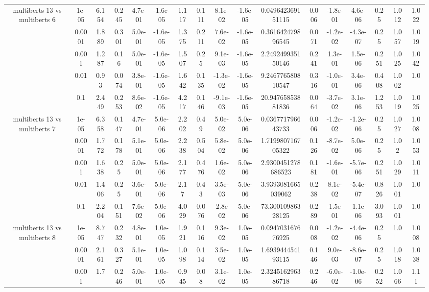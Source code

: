 \begin{tabular}{|c|c|c|c|c|c|c|c|c|c|c|c|c|c|c|c|c|}
\hline
\multirow{5}{*}{multiberts 13 vs multiberts 6} & 1e-05 & 6.154 & 0.245 & 4.7e-01 & -1.6e-05 & 1.117 & 0.111 & 8.1e-02 & -1.6e-05 & 0.049642369151115 & 0.006 & -1.8e-01 & 4.6e-06 & 0.25 & 1.012 & 1.022 \\
 & 0.0001 & 1.889 & 0.301 & 5.0e-01 & -1.6e-05 & 1.375 & 0.211 & 7.6e-02 & -1.6e-05 & 0.361642479896545 & 0.071 & -1.2e-02 & -4.3e-07 & 0.25 & 1.057 & 1.019 \\
 & 0.001 & 1.287 & 0.16 & 5.0e-01 & -1.6e-05 & 1.507 & 0.25 & 9.1e-03 & -1.6e-05 & 2.249249935150146 & 0.241 & 1.3e-01 & 1.5e-06 & 0.251 & 1.025 & 1.042 \\
 & 0.01 & 0.93 & 0.074 & 3.8e-01 & -1.6e-05 & 1.642 & 0.135 & -1.3e-02 & -1.6e-05 & 9.246776580810547 & 0.316 & -1.0e-01 & 3.4e-06 & 0.408 & 1.002 & 1.0 \\
 & 0.1 & 2.449 & 0.253 & 8.6e-02 & -1.6e-05 & 4.217 & 0.146 & -9.1e-03 & -1.6e-05 & 20.94765853881836 & 0.064 & -3.7e-02 & 3.1e-06 & 1.253 & 1.019 & 1.025 \\
\hline
\multirow{5}{*}{multiberts 13 vs multiberts 7} & 1e-05 & 6.358 & 0.147 & 4.7e-01 & 5.0e-06 & 2.202 & 0.49 & 5.0e-02 & 5.0e-06 & 0.036771796643733 & 0.006 & -1.2e-02 & -1.2e-06 & 0.25 & 1.027 & 1.008 \\
 & 0.0001 & 1.772 & 0.178 & 5.1e-01 & 5.0e-06 & 2.238 & 0.504 & 5.8e-02 & 5.0e-06 & 1.719980716705322 & 0.126 & -8.7e-02 & 5.0e-06 & 0.25 & 1.02 & 1.053 \\
 & 0.001 & 1.638 & 0.25 & 5.0e-01 & 5.0e-06 & 2.177 & 0.476 & 1.6e-02 & 5.0e-06 & 2.9300451278686523 & 0.181 & -1.6e-01 & -5.7e-06 & 0.251 & 1.029 & 1.011 \\
 & 0.01 & 1.406 & 0.25 & 3.6e-01 & 5.0e-06 & 2.17 & 0.43 & 3.5e-03 & 5.0e-06 & 3.9393081665039062 & 0.238 & 8.1e-02 & -5.4e-07 & 0.826 & 1.001 & 1.0 \\
 & 0.1 & 2.204 & 0.151 & 7.6e-02 & 5.0e-06 & 4.029 & 0.076 & -2.8e-02 & 5.0e-06 & 73.30010986328125 & 0.289 & -1.5e-01 & -1.1e-06 & 3.093 & 1.001 & 1.0 \\
\hline
\multirow{5}{*}{multiberts 13 vs multiberts 8} & 1e-05 & 8.747 & 0.232 & 4.8e-01 & 1.0e-05 & 1.921 & 0.116 & 9.3e-02 & 1.0e-05 & 0.094703167676925 & 0.008 & -1.2e-02 & -4.4e-06 & 0.25 & 1.0 & 1.008 \\
 & 0.0001 & 2.161 & 0.327 & 5.1e-01 & 1.0e-05 & 1.098 & 0.114 & 3.5e-02 & 1.0e-05 & 1.693944454193115 & 0.146 & 9.0e-03 & -8.6e-07 & 0.25 & 1.018 & 1.038 \\
 & 0.001 & 1.7 & 0.246 & 5.0e-01 & 1.0e-05 & 0.945 & 0.08 & 3.1e-02 & 1.0e-05 & 2.324516296386718 & 0.246 & -6.0e-02 & -1.0e-06 & 0.252 & 1.066 & 1.11 \\

\end{tabular}
